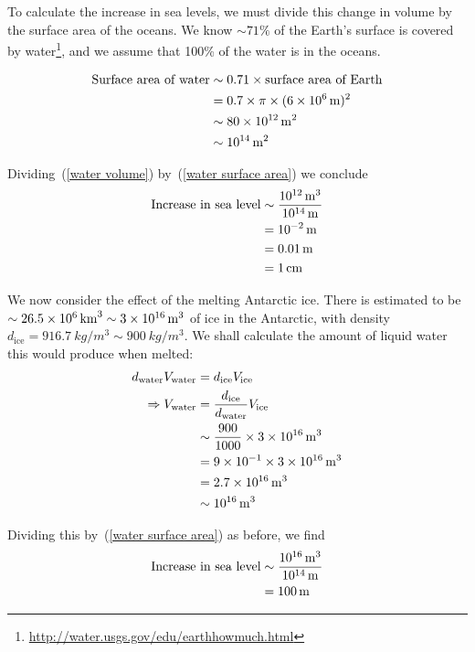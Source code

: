 \documentclass[a4paper]{article} %
\begin{document}
To calculate the increase in sea levels, we must divide this change in volume by the surface area of the oceans. We know $\sim 71\%$ of the Earth's surface is covered by water\footnote{\url{http://water.usgs.gov/edu/earthhowmuch.html}}, and we assume that 100\% of the water is in the oceans.

\begin{align}
\text{Surface area of water}&\sim 0.71\times \text{surface area of Earth}\\
&=0.7\times \pi\times (\SI{6d6}{m})^2\\
&\sim \SI{80d12}{m^2}\\
&\sim \SI{d14}{m^2}\label{water surface area}
\end{align}

Dividing~(\ref{water volume}) by~(\ref{water surface area}) we conclude
\begin{align}
\text{Increase in sea level}&\sim\frac{\SI{d12}{m^3}}{\SI{d14}{m}}\\
&=\SI{d-2}{m}\\
&=\SI{0.01}{m}\\
&=\SI{1}{cm}\\
\end{align}

\HRule

We now consider the effect of the melting Antarctic ice. There is estimated to be $\sim \SI{26.5d6}{km^3}\sim \SI{3d16}{m^3}$ of ice in the Antarctic, with density $d_{\text{ice}}=\SI{916.7}{kg/m^3}\sim \SI{900}{kg/m^3}$. We shall calculate the amount of liquid water this would produce when melted:
\begin{align}
d_{\text{water}}V_{\text{water}}&=d_{\text{ice}}V_{\text{ice}}\\
\Rightarrow V_{\text{water}}&=\frac{d_{\text{ice}}}{d_{\text{water}}}V_{\text{ice}}\\
&\sim \frac{900}{1000}\times \SI{3d16}{m^3}\\
&=9\times 10^{-1}\times \SI{3d16}{m^3}\\
&=\SI{2.7d16}{m^3}\\
&\sim \SI{d16}{m^3}
\end{align}

Dividing this by~(\ref{water surface area}) as before, we find
\begin{align}
\text{Increase in sea level}&\sim\frac{\SI{d16}{m^3}}{\SI{d14}{m}}\\
&=\SI{100}{m}\\
\end{align}
\end{document}
